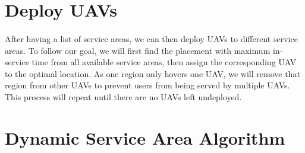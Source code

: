 \documentclass[a4paper,12pt]{report}
\begin{document}
\section{Deploy UAVs}
\paragraph{}
After having a list of service areas, we can then deploy UAVs to different service areas. To follow our goal, we will first find the placement with maximum in-service time from all available service areas, then assign the corresponding UAV to the optimal location. As one region only hovers one UAV, we will remove that region from other UAVs to prevent users from being served by multiple UAVs. This process will repeat until there are no UAVs left undeployed.

\section{Dynamic Service Area Algorithm}
\end{document}
